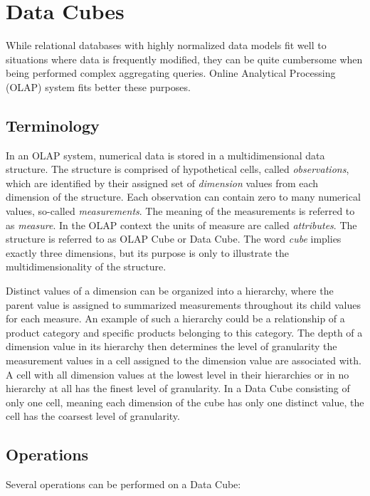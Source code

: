 \chapter{Data Cubes\label{datacubes}}

While relational databases with highly normalized data models fit well to situations where data is frequently modified, they can be quite cumbersome when being performed complex aggregating queries. Online Analytical Processing (OLAP) system fits better these purposes. 

\section{Terminology}

In an OLAP system, numerical data is stored in a multidimensional data structure. The structure is comprised of hypothetical cells, called \textit{observations}, which are identified by their assigned set of \textit{dimension} values from each dimension of the structure. Each observation can contain zero to many numerical values, so-called \textit{measurements}. The meaning of the measurements is referred to as \textit{measure}. In the OLAP context the units of measure are called \textit{attributes}. The structure is referred to as OLAP Cube or Data Cube. The word \textit{cube} implies exactly three dimensions, but its purpose is only to illustrate the multidimensionality of the structure.

Distinct values of a dimension can be organized into a hierarchy, where the parent value is assigned to summarized measurements throughout its child values for each measure. An example of such a hierarchy could be a relationship of a product category and specific products belonging to this category. The depth of a dimension value in its hierarchy then determines the level of granularity the measurement values in a cell assigned to the dimension value are associated with. A cell with all dimension values at the lowest level in their hierarchies or in no hierarchy at all has the finest level of granularity. In a Data Cube consisting of only one cell, meaning each dimension of the cube has only one distinct value, the cell has the coarsest level of granularity.

\section{Operations}

Several operations can be performed on a Data Cube:

